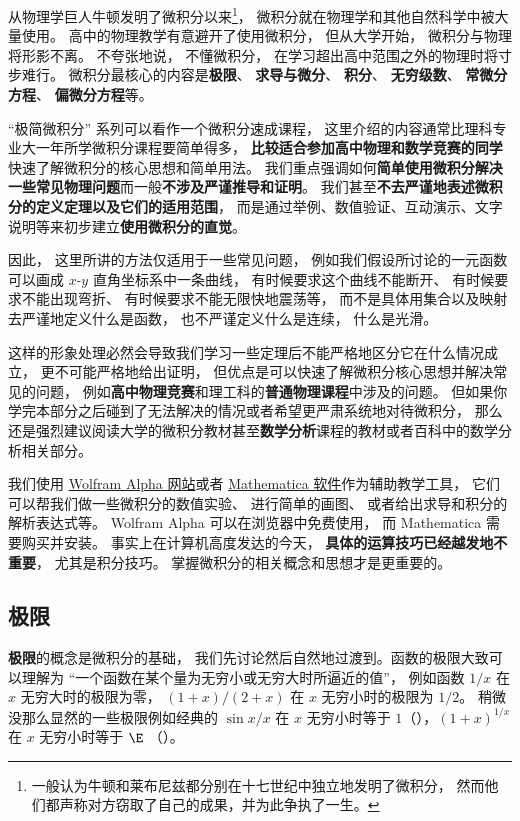 
\begin{issues}
\issueDraft
\end{issues}

从物理学巨人牛顿发明了微积分以来\footnote{一般认为牛顿和莱布尼兹都分别在十七世纪中独立地发明了微积分， 然而他们都声称对方窃取了自己的成果，并为此争执了一生。}， 微积分就在物理学和其他自然科学中被大量使用。 高中的物理教学有意避开了使用微积分， 但从大学开始， 微积分与物理将形影不离。 不夸张地说， 不懂微积分， 在学习超出高中范围之外的物理时将寸步难行。 微积分最核心的内容是\textbf{极限}、 \textbf{求导与微分}、 \textbf{积分}、 \textbf{无穷级数}、 \textbf{常微分方程}、 \textbf{偏微分方程}等。

“极简微积分” 系列可以看作一个微积分速成课程， 这里介绍的内容通常比理科专业大一年所学微积分课程要简单得多， \textbf{比较适合参加高中物理和数学竞赛的同学}快速了解微积分的核心思想和简单用法。 我们重点强调如何\textbf{简单使用微积分解决一些常见物理问题}而一般\textbf{不涉及严谨推导和证明}。 我们甚至\textbf{不去严谨地表述微积分的定义定理以及它们的适用范围}， 而是通过举例、数值验证、互动演示、文字说明等来初步建立\textbf{使用微积分的直觉}。

因此， 这里所讲的方法仅适用于一些常见问题， 例如我们假设所讨论的一元函数可以画成 $x$-$y$ 直角坐标系中一条曲线， 有时候要求这个曲线不能断开、 有时候要求不能出现弯折、 有时候要求不能无限快地震荡等， 而不是具体用集合以及映射去严谨地定义什么是函数， 也不严谨定义什么是连续， 什么是光滑。

这样的形象处理必然会导致我们学习一些定理后不能严格地区分它在什么情况成立， 更不可能严格地给出证明， 但优点是可以快速了解微积分核心思想并解决常见的问题， 例如\textbf{高中物理竞赛}和理工科的\textbf{普通物理课程}中涉及的问题。 但如果你学完本部分之后碰到了无法解决的情况或者希望更严肃系统地对待微积分， 那么还是强烈建议阅读大学的微积分教材甚至\textbf{数学分析}课程的教材或者百科中的数学分析相关部分。

我们使用 \href{https://www.wolframalpha.com/}{Wolfram Alpha 网站}或者 \href{https://www.wolfram.com/mathematica/}{Mathematica 软件}作为辅助教学工具， 它们可以帮我们做一些微积分的数值实验、 进行简单的画图、 或者给出求导和积分的解析表达式等。 Wolfram Alpha 可以在浏览器中免费使用， 而 Mathematica 需要购买并安装。 事实上在计算机高度发达的今天， \textbf{具体的运算技巧已经越发地不重要}， 尤其是积分技巧。 掌握微积分的相关概念和思想才是更重要的。

\subsection{极限}
\textbf{极限}的概念是微积分的基础， 我们先讨论然后自然地过渡到。函数的极限大致可以理解为 “一个函数在某个量为无穷小或无穷大时所逼近的值”， 例如函数 $1/x$ 在 $x$ 无穷大时的极限为零， $(1+x)/(2+x)$ 在 $x$ 无穷小时的极限为 $1/2$。 稍微没那么显然的一些极限例如经典的 $\sin x/ x$ 在 $x$ 无穷小时等于 $1$（），$(1+x)^{1/x}$ 在 $x$ 无穷小时等于 $\E$ （）。

